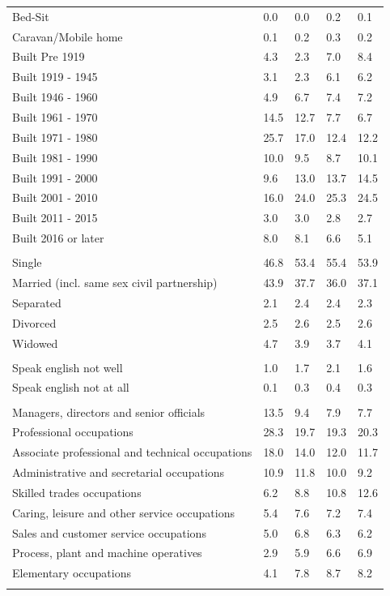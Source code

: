 \documentclass{article}
\begin{document}
\begin{table}[h]
\begin{tabular}{KTTTT}
Bed-Sit & 0.0& 0.0& 0.2& 0.1\\
Caravan/Mobile home & 0.1& 0.2& 0.3& 0.2\\
    \hline
Built Pre 1919 & 4.3& 2.3& 7.0& 8.4\\
Built 1919 - 1945 & 3.1& 2.3& 6.1& 6.2\\
Built  1946 - 1960 & 4.9& 6.7& 7.4& 7.2\\
Built  1961 - 1970 & 14.5& 12.7&  7.7&  6.7\\
Built  1971 - 1980 & 25.7& 17.0& 12.4& 12.2\\
Built  1981 - 1990 & 10.0&  9.5&  8.7& 10.1\\
Built  1991 - 2000 &  9.6& 13.0& 13.7& 14.5\\
Built  2001 - 2010 & 16.0& 24.0& 25.3& 24.5\\
Built  2011 - 2015 & 3.0& 3.0& 2.8& 2.7\\
Built  2016 or later & 8.0& 8.1& 6.6& 5.1\\
\hline
    \\
    \hline
Single & 46.8& 53.4& 55.4& 53.9\\
Married (incl. same sex civil partnership) & 43.9& 37.7& 36.0& 37.1\\
Separated  & 2.1& 2.4& 2.4& 2.3\\
Divorced  & 2.5& 2.6& 2.5& 2.6\\
Widowed & 4.7& 3.9& 3.7& 4.1\\
\hline
    \\ 
    \hline
Speak english not well & 1.0& 1.7& 2.1& 1.6\\
Speak english not at all & 0.1& 0.3& 0.4& 0.3\\
\hline
    \\
    \hline
Managers, directors and senior officials & 13.5&  9.4&  7.9&  7.7\\
Professional occupations & 28.3& 19.7& 19.3& 20.3\\
Associate professional and technical occupations & 18.0& 14.0& 12.0& 11.7\\
Administrative and secretarial occupations & 10.9& 11.8& 10.0&  9.2\\
Skilled trades occupations &  6.2&  8.8& 10.8& 12.6\\
Caring, leisure and other service occupations & 5.4& 7.6& 7.2& 7.4\\
Sales and customer service occupations & 5.0& 6.8& 6.3& 6.2\\
Process, plant and machine operatives & 2.9& 5.9& 6.6& 6.9\\
Elementary occupations & 4.1& 7.8& 8.7& 8.2\\
\hline
\end{tabular}
\end{table}
\end{document}
